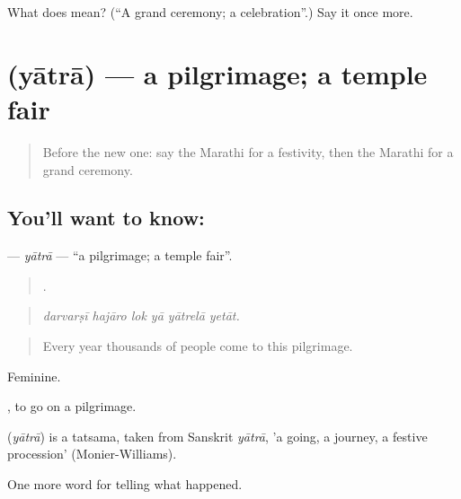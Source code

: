 \begin{tcolorbox}[breakable,colback=teal!4,colframe=teal!35!black,title={Before you move on}]
What does  mean? (\textquotedblleft{}A grand ceremony; a celebration\textquotedblright{}.) Say it once more.
\end{tcolorbox}
\section[\texorpdfstring{\mr{यात्रा} (yātrā)}{यात्रा (yātrā)}]{ (yātrā) — a pilgrimage; a temple fair}

\label{lesson:MR-C320-yatra}



\begin{quote}
Before the new one: say the Marathi for a festivity, then the Marathi for a grand ceremony.
\end{quote}

\subsection*{You'll want to know: }
\textbf{} — \emph{yātrā} — \textquotedblleft{}a pilgrimage; a temple fair\textquotedblright{}.

\begin{quote}
     .
\end{quote}

\begin{quote}
\emph{darvarṣī hajāro lok yā yātrelā yetāt.}
\end{quote}

\begin{quote}
Every year thousands of people come to this pilgrimage.
\end{quote}

Feminine.

 , to go on a pilgrimage.

\begin{cousinweb}
\textbf{} (\emph{yātrā}) is a tatsama, taken from Sanskrit \emph{yātrā}, 'a going, a journey, a festive procession' (Monier-Williams).
\end{cousinweb}

\begin{grammarlens}[title={What you've built}]
One more word for telling what happened.
\end{grammarlens}

